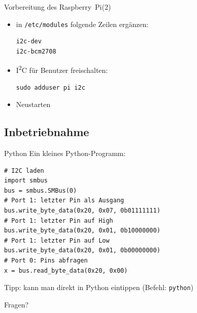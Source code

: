 \documentclass{beamer}
\newcommand{\ItC}{I\textsuperscript{2}C\xspace}
\newcommand{\RPi}{Raspberry~Pi\xspace}
\begin{document}
\begin{frame}[fragile]{Vorbereitung des \RPi  (2)}
 \begin{itemize}
  \item in \lstinline|/etc/modules| folgende Zeilen ergänzen:
    \begin{lstlisting}
i2c-dev
i2c-bcm2708
    \end{lstlisting}
  \item \ItC für Benutzer freischalten:
    \begin{lstlisting}
sudo adduser pi i2c
    \end{lstlisting}
  \item Neustarten
 \end{itemize}
\end{frame}

\subsection{Inbetriebnahme}

\begin{frame}[fragile]{Python}
 Ein kleines Python-Programm:
 \lstset{language=Python}
 \begin{lstlisting}
# I2C laden
import smbus
bus = smbus.SMBus(0)
# Port 1: letzter Pin als Ausgang
bus.write_byte_data(0x20, 0x07, 0b01111111)
# Port 1: letzter Pin auf High
bus.write_byte_data(0x20, 0x01, 0b10000000)
# Port 1: letzter Pin auf Low
bus.write_byte_data(0x20, 0x01, 0b00000000)
# Port 0: Pins abfragen
x = bus.read_byte_data(0x20, 0x00)
 \end{lstlisting}
 Tipp: kann man direkt in Python eintippen (Befehl: \lstinline[language=bash]|python|)
\end{frame}

\begin{frame}[plain]
        \begin{center}
        \huge Fragen?
    \end{center}
        \tableofcontents
\end{frame}
\end{document}
